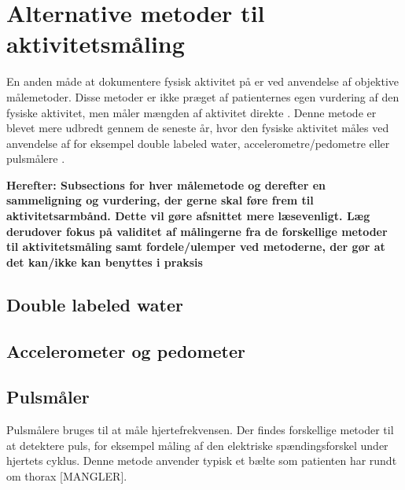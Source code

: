 \section{Alternative metoder til aktivitetsmåling}

En anden måde at dokumentere fysisk aktivitet på er ved anvendelse af objektive målemetoder. Disse metoder er ikke præget af patienternes egen vurdering af den fysiske aktivitet, men måler mængden af aktivitet direkte \cite{pedersen2011, adamo2009}. 
Denne metode er blevet mere udbredt gennem de seneste år, hvor den fysiske aktivitet måles ved anvendelse af for eksempel double labeled water, accelerometre/pedometre eller pulsmålere \cite{motionsraad2007, pedersen2011, adamo2009}. 

\textbf{Herefter: Subsections for hver målemetode og derefter en sammeligning og vurdering, der gerne skal føre frem til aktivitetsarmbånd. Dette vil gøre afsnittet mere læsevenligt. Læg derudover fokus på validitet af målingerne fra de forskellige metoder til aktivitetsmåling samt fordele/ulemper ved metoderne, der gør at det kan/ikke kan benyttes i praksis}

\subsection*{Double labeled water}
\subsection*{Accelerometer og pedometer}
\subsection*{Pulsmåler}




Pulsmålere bruges til at måle hjertefrekvensen. 
Der findes forskellige metoder til at detektere puls, for eksempel måling af den elektriske spændingsforskel under hjertets cyklus. Denne metode anvender typisk et bælte som patienten har rundt om thorax \cite{motionsraad2007} [MANGLER]. 


